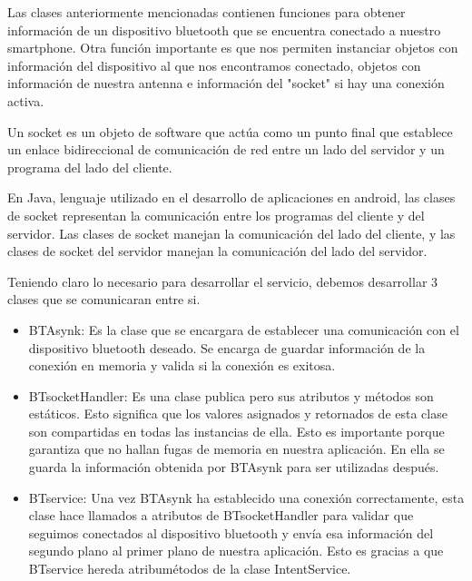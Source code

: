 \par \noindent
Las clases anteriormente mencionadas contienen funciones para obtener información de un dispositivo bluetooth que se encuentra conectado a nuestro smartphone. Otra función importante es que nos permiten instanciar objetos con información del dispositivo al que nos encontramos conectado, objetos con información de nuestra antenna e información del "socket" si hay una conexión activa. 

\par \noindent
Un socket es un objeto de software que actúa como un punto final que establece un enlace bidireccional de comunicación de red entre un lado del servidor y un programa del lado del cliente.\cite{socket}

\par \noindent
En Java, lenguaje utilizado en el desarrollo de aplicaciones en android, las clases de socket representan la comunicación entre los programas del cliente y del servidor. Las clases de socket manejan la comunicación del lado del cliente, y las clases de socket del servidor manejan la comunicación del lado del servidor.\cite{socket}

\par \noindent
Teniendo claro lo necesario para desarrollar el servicio, debemos desarrollar 3 clases que se comunicaran entre si.

\begin{itemize}
	\item BTAsynk: Es la clase que se encargara de establecer una comunicación con el dispositivo bluetooth deseado. Se encarga de guardar información de la conexión en memoria y valida si la conexión es exitosa.
	
	\item BTsocketHandler: Es una clase publica pero sus atributos y métodos son estáticos. Esto significa que los valores asignados y retornados de esta clase son compartidas en todas las instancias de ella. Esto es importante porque garantiza que no hallan fugas de memoria en nuestra aplicación. En ella se guarda la información obtenida por BTAsynk para ser utilizadas después.
	
	\item BTservice: Una vez BTAsynk ha establecido una conexión correctamente, esta clase hace llamados a atributos de BTsocketHandler para validar que seguimos conectados al dispositivo bluetooth y envía esa información del segundo plano al primer plano de nuestra aplicación. Esto es gracias a que BTservice hereda atribumétodos de la clase IntentService.
	
\end{itemize}

